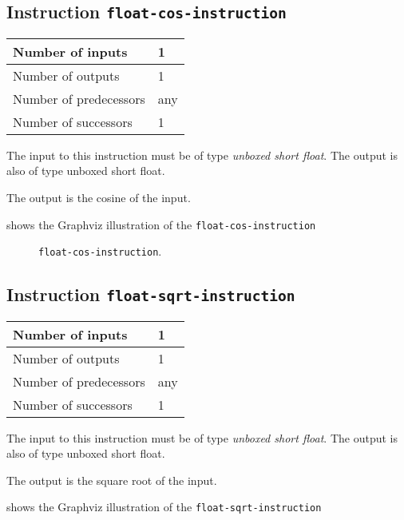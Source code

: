 \subsection{Instruction \texttt{float-cos-instruction}}
\label{mir-instruction-float-div}

\begin{tabular}{|l|l|}
\hline
Number of inputs & 1\\
\hline
Number of outputs & 1\\
\hline
Number of predecessors & any\\
\hline
Number of successors & 1\\
\hline
\end{tabular}

The input to this instruction must be of type \emph{unboxed short
  float}. The output is also of type unboxed short float.

The output is the cosine of the input.

 shows the Graphviz illustration of the
\texttt{float-cos-instruction}

\begin{figure}
\begin{center}
\end{center}
\caption{\label{fig-float-cos-instruction}
\texttt{float-cos-instruction}.}
\end{figure}

\subsection{Instruction \texttt{float-sqrt-instruction}}
\label{mir-instruction-float-div}

\begin{tabular}{|l|l|}
\hline
Number of inputs & 1\\
\hline
Number of outputs & 1\\
\hline
Number of predecessors & any\\
\hline
Number of successors & 1\\
\hline
\end{tabular}

The input to this instruction must be of type \emph{unboxed short
  float}. The output is also of type unboxed short float.

The output is the square root of the input.

 shows the Graphviz illustration of the
\texttt{float-sqrt-instruction}


